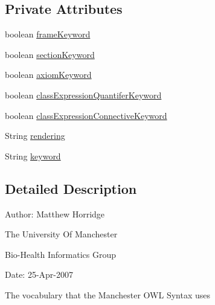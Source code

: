 \subsection*{Private Attributes}
\begin{DoxyCompactItemize}
\item 
boolean \hyperlink{enumorg_1_1coode_1_1owlapi_1_1manchesterowlsyntax_1_1_manchester_o_w_l_syntax_a1ad08210391f864eabc258628e3ba578}{frame\-Keyword}
\item 
boolean \hyperlink{enumorg_1_1coode_1_1owlapi_1_1manchesterowlsyntax_1_1_manchester_o_w_l_syntax_ae28b84db33e85e2aea44c30dbacf474d}{section\-Keyword}
\item 
boolean \hyperlink{enumorg_1_1coode_1_1owlapi_1_1manchesterowlsyntax_1_1_manchester_o_w_l_syntax_a0266e5c6568466e20dda360230f9ba1f}{axiom\-Keyword}
\item 
boolean \hyperlink{enumorg_1_1coode_1_1owlapi_1_1manchesterowlsyntax_1_1_manchester_o_w_l_syntax_a716598df3ab88d48b7cc954ec76f3744}{class\-Expression\-Quantifer\-Keyword}
\item 
boolean \hyperlink{enumorg_1_1coode_1_1owlapi_1_1manchesterowlsyntax_1_1_manchester_o_w_l_syntax_a062b1b09809e876017ddb45a74e68206}{class\-Expression\-Connective\-Keyword}
\item 
String \hyperlink{enumorg_1_1coode_1_1owlapi_1_1manchesterowlsyntax_1_1_manchester_o_w_l_syntax_af7eb5fe18cd56ce6d8d2dc97a6722bc3}{rendering}
\item 
String \hyperlink{enumorg_1_1coode_1_1owlapi_1_1manchesterowlsyntax_1_1_manchester_o_w_l_syntax_a51fc2a47273076f58a2600ac18f5273f}{keyword}
\end{DoxyCompactItemize}


\subsection{Detailed Description}
Author\-: Matthew Horridge\par
 The University Of Manchester\par
 Bio-\/\-Health Informatics Group\par
 Date\-: 25-\/\-Apr-\/2007\par
\par
 

The vocabulary that the Manchester O\-W\-L Syntax uses 

